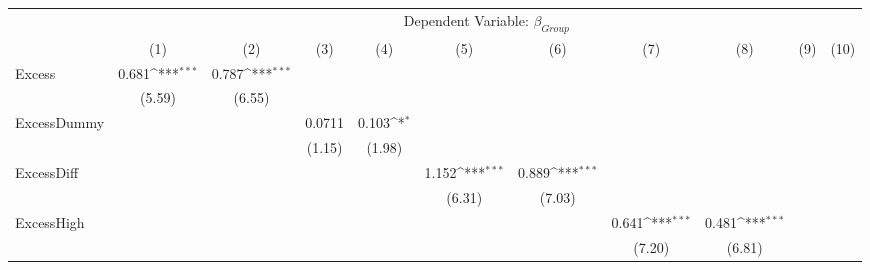 {
\def\sym#1{\ifmmode^{#1}\else\(^{#1}\)\fi}
\begin{tabular}{l*{10}{c}}
\hline\hline
                &\multicolumn{10}{c}{Dependent Variable: $ \beta_{Group} $ }                                                                                                                                  \\\cmidrule(lr){2-11}
                &\multicolumn{1}{c}{(1)}         &\multicolumn{1}{c}{(2)}         &\multicolumn{1}{c}{(3)}         &\multicolumn{1}{c}{(4)}         &\multicolumn{1}{c}{(5)}         &\multicolumn{1}{c}{(6)}         &\multicolumn{1}{c}{(7)}         &\multicolumn{1}{c}{(8)}         &\multicolumn{1}{c}{(9)}         &\multicolumn{1}{c}{(10)}         \\
\hline
Excess          &    0.681\sym{***}&    0.787\sym{***}&                  &                  &                  &                  &                  &                  &                  &                  \\
                &   (5.59)         &   (6.55)         &                  &                  &                  &                  &                  &                  &                  &                  \\
[1em]
ExcessDummy     &                  &                  &   0.0711         &    0.103\sym{*}  &                  &                  &                  &                  &                  &                  \\
                &                  &                  &   (1.15)         &   (1.98)         &                  &                  &                  &                  &                  &                  \\
[1em]
ExcessDiff      &                  &                  &                  &                  &    1.152\sym{***}&    0.889\sym{***}&                  &                  &                  &                  \\
                &                  &                  &                  &                  &   (6.31)         &   (7.03)         &                  &                  &                  &                  \\
[1em]
ExcessHigh      &                  &                  &                  &                  &                  &                  &    0.641\sym{***}&    0.481\sym{***}&                  &                  \\
                &                  &                  &                  &                  &                  &                  &   (7.20)         &   (6.81)         &                  &                  \\

\end{tabular}}
